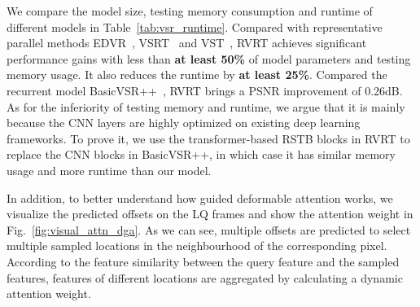 \documentclass{article}
\newlength \g
\begin{document}
We compare the model size, testing memory consumption and runtime of different models in Table~\ref{tab:vsr_runtime}. Compared with representative parallel methods EDVR~\cite{wang2019edvr}, VSRT~\cite{cao2021videosr} and  VST~\cite{liang2022vrt}, RVRT achieves significant performance gains with less than \textbf{at least 50\%} of model parameters and testing memory usage. It also reduces the runtime by \textbf{at least 25\%}. Compared the recurrent model BasicVSR++~\cite{chan2021basicvsr++}, RVRT brings a PSNR improvement of 0.26dB. As for the inferiority of testing memory and runtime, we argue that it is mainly because the CNN layers are highly optimized on existing deep learning frameworks. To prove it, we use the transformer-based RSTB blocks in RVRT to replace the CNN blocks in BasicVSR++, in which case it has similar memory usage and more runtime than our model.

In addition, to better understand how guided deformable attention works, we visualize the predicted offsets on the LQ frames and show the attention weight in Fig.~\ref{fig:visual_attn_dga}. As we can see, multiple offsets are predicted to select multiple sampled locations in the neighbourhood of the corresponding pixel. According to the feature similarity between the query feature and the sampled features, features of different locations are aggregated by calculating a dynamic attention weight.
\end{document}
